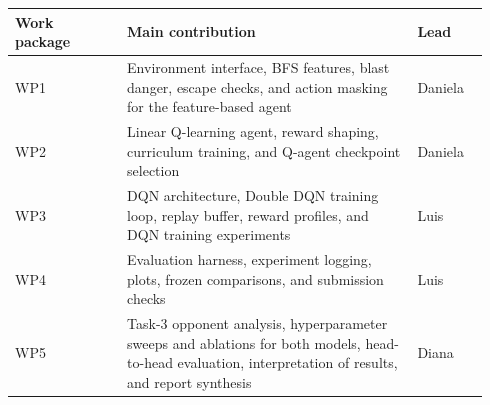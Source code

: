 \documentclass[11pt]{article}
\begin{document}
\begin{table}[htbp]
\centering
\small
\begin{tabular}{@{}p{0.22\linewidth}p{0.58\linewidth}p{0.14\linewidth}@{}}
\toprule
Work package & Main contribution & Lead \\
\midrule
WP1 & Environment interface, BFS features, blast danger, escape checks, and action masking for the feature-based agent & Daniela \\
WP2 & Linear Q-learning agent, reward shaping, curriculum training, and Q-agent checkpoint selection & Daniela \\
WP3 & DQN architecture, Double DQN training loop, replay buffer, reward profiles, and DQN training experiments & Luis \\
WP4 & Evaluation harness, experiment logging, plots, frozen comparisons, and submission checks & Luis \\
WP5 & Task-3 opponent analysis, hyperparameter sweeps and ablations for both models, head-to-head evaluation, interpretation of results, and report synthesis & Diana \\
\bottomrule
\end{tabular}
\end{table}
\end{document}
